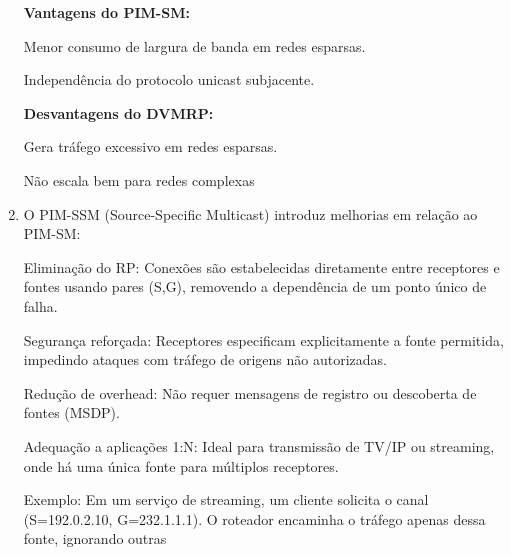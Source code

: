 \begin{enumerate}[label=\alph*.]
\textbf{Vantagens do PIM-SM:}

Menor consumo de largura de banda em redes esparsas.

Independência do protocolo unicast subjacente.

\textbf{Desvantagens do DVMRP:}

Gera tráfego excessivo em redes esparsas.

Não escala bem para redes complexas

\item O PIM-SSM (Source-Specific Multicast) introduz melhorias em relação ao PIM-SM:

Eliminação do RP: Conexões são estabelecidas diretamente entre receptores e fontes usando pares (S,G), removendo a dependência de um ponto único de falha.

Segurança reforçada: Receptores especificam explicitamente a fonte permitida, impedindo ataques com tráfego de origens não autorizadas.

Redução de overhead: Não requer mensagens de registro ou descoberta de fontes (MSDP).

Adequação a aplicações 1:N: Ideal para transmissão de TV/IP ou streaming, onde há uma única fonte para múltiplos receptores.

Exemplo: Em um serviço de streaming, um cliente solicita o canal (S=192.0.2.10, G=232.1.1.1). O roteador encaminha o tráfego apenas dessa fonte, ignorando outras
\end{enumerate}